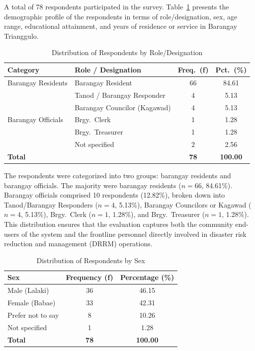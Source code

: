 \documentclass{research}
\begin{document}
A total of 78 respondents participated in the survey. Table~\ref{tab:role} presents the
demographic profile of the respondents in terms of role/designation, sex, age range,
educational attainment, and years of residence or service in Barangay Trianggulo.
 
\begin{table}[htbp]
\centering
\small
\caption{Distribution of Respondents by Role/Designation}
\label{tab:role}
\begin{tabular}{p{3.5cm}|p{5.5cm}|c|c}
\hline
\textbf{Category} & \textbf{Role / Designation} & \textbf{Freq.\ (f)} & \textbf{Pct.\ (\%)} \\
\hline
Barangay Residents & Barangay Resident & 66 & 84.61 \\
\hline
\multirow{5}{3.5cm}{Barangay Officials}
  & Tanod / Barangay Responder    & 4  & 5.13  \\
  & Barangay Councilor (Kagawad)  & 4  & 5.13  \\
  & Brgy.\ Clerk                  & 1  & 1.28  \\
  & Brgy.\ Treasurer              & 1  & 1.28  \\
  & Not specified                 & 2  & 2.56  \\
\hline
\textbf{Total} & & \textbf{78} & \textbf{100.00} \\
\hline
\end{tabular}
\end{table}
 
The respondents were categorized into two groups: barangay residents and barangay
officials. The majority were barangay residents ($n=66$, 84.61\%). Barangay officials
comprised 10 respondents (12.82\%), broken down into Tanod/Barangay Responders
($n=4$, 5.13\%), Barangay Councilors or Kagawad ($n=4$, 5.13\%), Brgy.\ Clerk
($n=1$, 1.28\%), and Brgy.\ Treasurer ($n=1$, 1.28\%). This distribution ensures that
the evaluation captures both the community end-users of the system and the frontline
personnel directly involved in disaster risk reduction and management (DRRM)
operations.
 
\begin{table}[htbp]
\centering
\small
\caption{Distribution of Respondents by Sex}
\label{tab:sex}
\begin{tabular}{p{7cm}|c|c}
\hline
\textbf{Sex} & \textbf{Frequency (f)} & \textbf{Percentage (\%)} \\
\hline
Male (Lalaki)      & 36 & 46.15 \\
Female (Babae)     & 33 & 42.31 \\
Prefer not to say  &  8 & 10.26 \\
Not specified      &  1 &  1.28 \\
\hline
\textbf{Total}     & \textbf{78} & \textbf{100.00} \\
\hline
\end{tabular}
\end{table}
 
\end{document}
